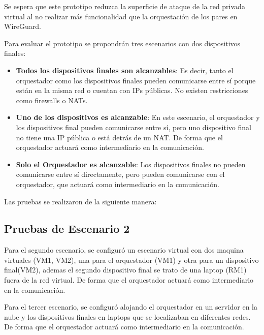 Se espera que este prototipo reduzca la superficie de ataque de la red privada virtual al no realizar más funcionalidad que la orquestación de los pares en WireGuard. 


Para evaluar el prototipo se propondrán tres escenarios con dos dispositivos finales:
\begin{itemize}
    \item \textbf{Todos los dispositivos finales son alcanzables}: Es decir, tanto el orquestador como los dispositivos finales pueden comunicarse entre sí porque están en la misma red o cuentan con IPs públicas. No existen restricciones como firewalls o NATs.
    
    \item \textbf{Uno de los dispositivos es alcanzable}: En este escenario, el orquestador y los dispositivos final pueden comunicarse entre sí, pero uno dispositivo final no tiene una IP pública o está detrás de un NAT. De forma que el orquestador actuará como intermediario en la comunicación.
    
    \item \textbf{Solo el Orquestador es alcanzable}: Los dispositivos finales no pueden comunicarse entre sí directamente, pero pueden comunicarse con el orquestador, que actuará como intermediario en la comunicación.
\end{itemize}

Las pruebas se realizaron de la siguiente manera:






\subsection{Pruebas de Escenario 2}

Para el segundo escenario, se configuró un escenario virtual con dos maquina virtuales (VM1, VM2), una para el orquestador (VM1) y otra para un dispositivo final(VM2), ademas el segundo dispositivo final se trato de una laptop (RM1) fuera de la red virtual. De forma que el orquestador actuará como intermediario en la comunicación.



Para el tercer escenario, se configuró alojando el orquestador en un servidor en la nube y los dispositivos finales en laptops que se localizaban en diferentes redes. De forma que el orquestador actuará como intermediario en la comunicación.
